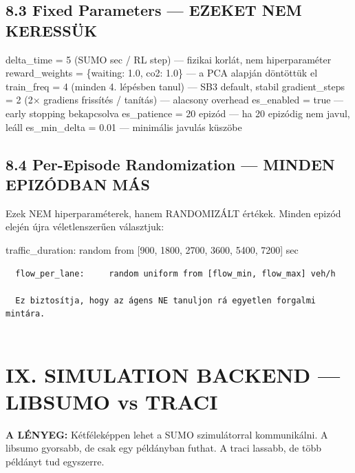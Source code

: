 \documentclass[11pt,a4paper]{article}
\begin{document}
\subsection*{8.3 Fixed Parameters — EZEKET NEM KERESSÜK}
delta\_time = 5 (SUMO sec / RL step) — fizikai korlát, nem hiperparaméter
reward\_weights = \{waiting: 1.0, co2: 1.0\} — a PCA alapján döntöttük el
train\_freq = 4 (minden 4. lépésben tanul) — SB3 default, stabil
gradient\_steps = 2 (2× gradiens frissítés / tanítás) — alacsony overhead
es\_enabled = true — early stopping bekapcsolva
es\_patience = 20 epizód — ha 20 epizódig nem javul, leáll
es\_min\_delta = 0.01 — minimális javulás küszöbe

\subsection*{8.4 Per-Episode Randomization — MINDEN EPIZÓDBAN MÁS}
Ezek NEM hiperparaméterek, hanem RANDOMIZÁLT értékek.
Minden epizód elején újra véletlenszerűen választjuk:

traffic\_duration:  random from [900, 1800, 2700, 3600, 5400, 7200] sec
\vspace{1em}\begin{verbatim}
  flow_per_lane:     random uniform from [flow_min, flow_max] veh/h

  Ez biztosítja, hogy az ágens NE tanuljon rá egyetlen forgalmi mintára.


\end{verbatim}
\section*{IX. SIMULATION BACKEND — LIBSUMO vs TRACI}

\textbf{A LÉNYEG:} Kétféleképpen lehet a SUMO szimulátorral kommunikálni.
A libsumo gyorsabb, de csak egy példányban futhat. A traci lassabb,
de több példányt tud egyszerre.
\end{document}
